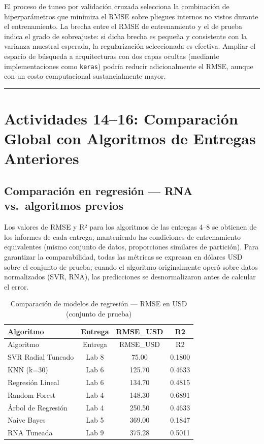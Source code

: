 \documentclass[
]{article}
\begin{document}
El proceso de tuneo por validación cruzada selecciona la combinación de
hiperparámetros que minimiza el RMSE sobre pliegues internos no vistos
durante el entrenamiento. La brecha entre el RMSE de entrenamiento y el
de prueba indica el grado de sobreajuste: si dicha brecha es pequeña y
consistente con la varianza muestral esperada, la regularización
seleccionada es efectiva. Ampliar el espacio de búsqueda a arquitecturas
con dos capas ocultas (mediante implementaciones como \texttt{keras})
podría reducir adicionalmente el RMSE, aunque con un costo computacional
sustancialmente mayor.

\begin{center}\rule{0.5\linewidth}{0.5pt}\end{center}

\section{Actividades 14--16: Comparación Global con Algoritmos de
Entregas
Anteriores}\label{actividades-1416-comparaciuxf3n-global-con-algoritmos-de-entregas-anteriores}

\subsection{Comparación en regresión --- RNA vs.~algoritmos
previos}\label{comparaciuxf3n-en-regresiuxf3n-rna-vs.-algoritmos-previos}

Los valores de RMSE y R² para los algoritmos de las entregas 4--8 se
obtienen de los informes de cada entrega, manteniendo las condiciones de
entrenamiento equivalentes (mismo conjunto de datos, proporciones
similares de partición). Para garantizar la comparabilidad, todas las
métricas se expresan en dólares USD sobre el conjunto de prueba; cuando
el algoritmo originalmente operó sobre datos normalizados (SVR, RNA),
las predicciones se desnormalizaron antes de calcular el error.

\begin{longtable}[]{@{}lccc@{}}
\caption{Comparación de modelos de regresión --- RMSE en USD (conjunto
de prueba)}\tabularnewline
\toprule\noalign{}
Algoritmo & Entrega & RMSE\_USD & R2 \\
\midrule\noalign{}
\endfirsthead
\toprule\noalign{}
Algoritmo & Entrega & RMSE\_USD & R2 \\
\midrule\noalign{}
\endhead
\bottomrule\noalign{}
\endlastfoot
SVR Radial Tuneado & Lab 8 & 75.00 & 0.1800 \\
KNN (k=30) & Lab 6 & 125.70 & 0.4633 \\
Regresión Lineal & Lab 6 & 134.70 & 0.4815 \\
Random Forest & Lab 4 & 148.30 & 0.6891 \\
Árbol de Regresión & Lab 4 & 250.50 & 0.4633 \\
Naive Bayes & Lab 5 & 369.00 & 0.1847 \\
RNA Tuneada & Lab 9 & 375.28 & 0.5011 \\
\end{longtable}
\end{document}

